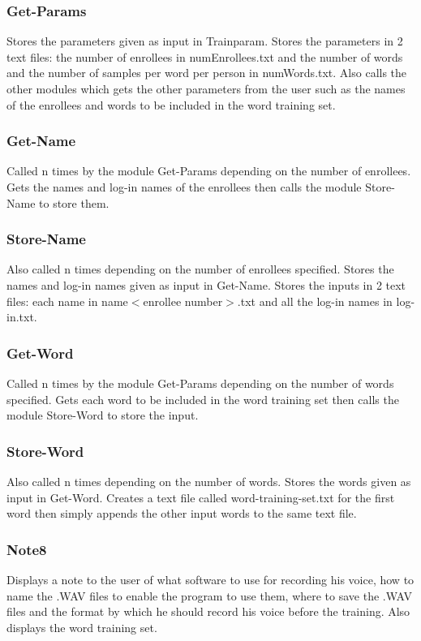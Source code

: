 \subsubsection{Get-Params}
Stores the parameters given as input in Trainparam. Stores the
parameters in 2 text files: the number of enrollees in
numEnrollees.txt and the number of words and the number of samples
per word per person in numWords.txt. Also calls the other modules
which gets the other parameters from the user such as the names of
the enrollees and words to be included in the word training set.

\subsubsection{Get-Name}
Called n times by the module Get-Params depending on the number of
enrollees. Gets the names and log-in names of the enrollees then
calls the module Store-Name to store them.

\subsubsection{Store-Name}
Also called n times depending on the number of enrollees
specified. Stores the names and log-in names given as input in
Get-Name. Stores the inputs in 2 text files: each name in
name$<$enrollee number$>$.txt and all the log-in names in
log-in.txt.

\subsubsection{Get-Word}
Called n times by the module Get-Params depending on the number of
words specified. Gets each word to be included in the word
training set then calls the module Store-Word to store the input.

\subsubsection{Store-Word}
Also called n times depending on the number of words. Stores the
words given as input in Get-Word. Creates a text file called
word-training-set.txt for the first word then simply appends the
other input words to the same text file.

\subsubsection{Note8}
Displays a note to the user of what software to use for recording
his voice, how to name the .WAV files to enable the program to use
them, where to save the .WAV files and the format by which he
should record his voice before the training. Also displays the
word training set.

